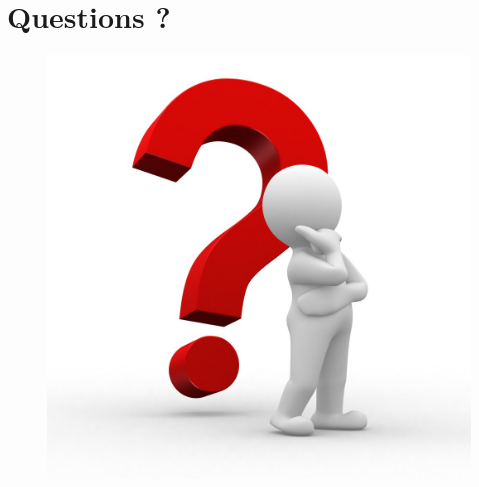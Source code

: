 \documentclass{beamer}
\theoremstyle{plain}
\begin{document}
	\section{Questions ?}
	\begin{frame}
		\begin{figure}
			\includegraphics[scale=.20]{Qman.png}
		\end{figure}
	\end{frame}
	
\end{document}
